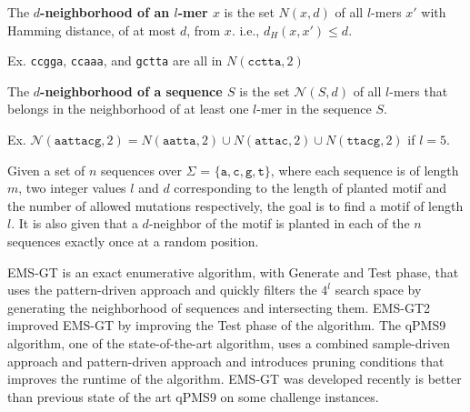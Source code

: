  \newline
\noindent The \textbf{\boldmath $d$-neighborhood of an $l$-mer $x$} is the set {\boldmath $N(x, d)$} of all $l$-mers $x'$ with Hamming distance, of at most $d$, from $x$. i.e., {\boldmath $d_H (x, x') \leq d$}.

\noindent \hspace*{35pt} Ex. \texttt{ccgga}, \texttt{ccaaa}, and \texttt{gctta} are all in $N(\texttt{cctta}, 2)$ \newline

 \newline
\noindent The \textbf{\boldmath $d$-neighborhood of a sequence $S$} is the set {\boldmath $\mathcal{N}(S, d)$} of all $l$-mers that belongs in the neighborhood of at least one $l$-mer in the sequence $S$.

\noindent \hspace*{35pt} Ex. {\small $\mathcal{N}(\texttt{aattacg}, 2) = N(\texttt{aatta}, 2) \cup N(\texttt{attac}, 2) \cup N(\texttt{ttacg}, 2)$} \newline
\noindent \hspace*{55pt} if $l = 5$. \newline

 \newline
\noindent Given a set of $n$ sequences over $\Sigma$ = $\{\texttt{a}, \texttt{c}, \texttt{g}, \texttt{t}\}$, where each sequence is of length $m$, two integer values $l$ and $d$ corresponding to the length of planted motif and the number of allowed mutations respectively, the goal is to find a motif of length $l$. It is also given that a $d$-neighbor of the motif is planted in each of the $n$ sequences exactly once at a random position.

 \newline
\noindent EMS-GT is an exact enumerative algorithm, with Generate and Test phase, that uses the pattern-driven approach and quickly filters the $4^l$ search space by generating the neighborhood of sequences and intersecting them. EMS-GT2 improved EMS-GT by improving the Test phase of the algorithm. The qPMS9 algorithm, one of the state-of-the-art algorithm, uses a combined sample-driven approach and pattern-driven approach and introduces pruning conditions that improves the runtime of the algorithm. EMS-GT was developed recently is better than previous state of the art qPMS9 on some challenge instances.



